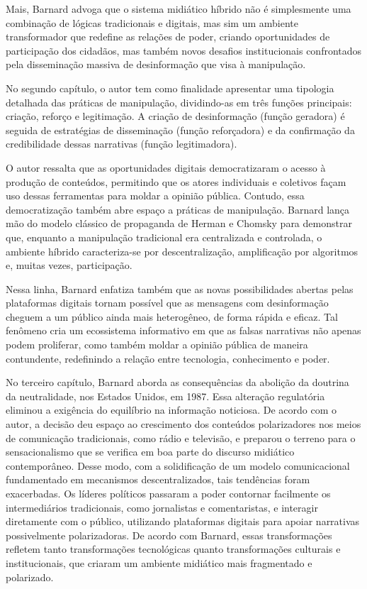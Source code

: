 \documentclass[portuguese]{textolivre}
\begin{document}
Mais, Barnard advoga que o sistema midiático híbrido não é simplesmente uma combinação de lógicas tradicionais e digitais, mas sim um ambiente transformador que redefine as relações de poder, criando oportunidades de participação dos cidadãos, mas também novos desafios institucionais confrontados pela disseminação massiva de desinformação que visa à manipulação.

No segundo capítulo, o autor tem como finalidade apresentar uma tipologia detalhada das práticas de manipulação, dividindo-as em três funções principais: criação, reforço e legitimação. A criação de desinformação (função geradora) é seguida de estratégias de disseminação (função reforçadora) e da confirmação da credibilidade dessas narrativas (função legitimadora).

O autor ressalta que as oportunidades digitais democratizaram o acesso à produção de conteúdos, permitindo que os atores individuais e coletivos façam uso dessas ferramentas para moldar a opinião pública. Contudo, essa democratização também abre espaço a práticas de manipulação. Barnard lança mão do modelo clássico de propaganda de Herman e Chomsky para demonstrar que, enquanto a manipulação tradicional era centralizada e controlada, o ambiente híbrido caracteriza-se por descentralização, amplificação por algoritmos e, muitas vezes, participação.

Nessa linha, Barnard enfatiza também que as novas possibilidades abertas pelas plataformas digitais tornam possível que as mensagens com desinformação cheguem a um público ainda mais heterogêneo, de forma rápida e eficaz. Tal fenômeno cria um ecossistema informativo em que as falsas narrativas não apenas podem proliferar, como também moldar a opinião pública de maneira contundente, redefinindo a relação entre tecnologia, conhecimento e poder. 

No terceiro capítulo, Barnard aborda as consequências da abolição da doutrina da neutralidade, nos Estados Unidos, em 1987. Essa alteração regulatória eliminou a exigência do equilíbrio na informação noticiosa. De acordo com o autor, a decisão deu espaço ao crescimento dos conteúdos polarizadores nos meios de comunicação tradicionais, como rádio e televisão, e preparou o terreno para o sensacionalismo que se verifica em boa parte do discurso midiático contemporâneo. Desse modo, com a solidificação de um modelo comunicacional fundamentado em mecanismos descentralizados, tais tendências foram exacerbadas. Os líderes políticos passaram a poder contornar facilmente os intermediários tradicionais, como jornalistas e comentaristas, e interagir diretamente com o público, utilizando plataformas digitais para apoiar narrativas possivelmente polarizadoras. De acordo com Barnard, essas transformações refletem tanto transformações tecnológicas quanto transformações culturais e institucionais, que criaram um ambiente midiático mais fragmentado e polarizado. 
\end{document}
